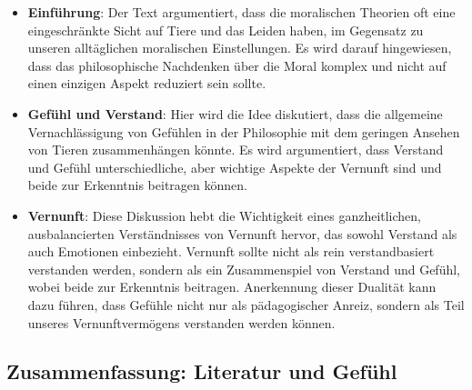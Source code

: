 \documentclass{article}
\begin{document}
\begin{itemize}
	\item \textbf{Einführung}: Der Text argumentiert, dass die moralischen Theorien oft eine eingeschränkte Sicht auf Tiere und das Leiden haben, im Gegensatz zu unseren alltäglichen moralischen Einstellungen. Es wird darauf hingewiesen, dass das philosophische Nachdenken über die Moral komplex und nicht auf einen einzigen Aspekt reduziert sein sollte.

	\item \textbf{Gefühl und Verstand}: Hier wird die Idee diskutiert, dass die allgemeine Vernachlässigung von Gefühlen in der Philosophie mit dem geringen Ansehen von Tieren zusammenhängen könnte. Es wird argumentiert, dass Verstand und Gefühl unterschiedliche, aber wichtige Aspekte der Vernunft sind und beide zur Erkenntnis beitragen können.

	\item \textbf{Vernunft}: Diese Diskussion hebt die Wichtigkeit eines ganzheitlichen, ausbalancierten Verständnisses von Vernunft hervor, das sowohl Verstand als auch Emotionen einbezieht. Vernunft sollte nicht als rein verstandbasiert verstanden werden, sondern als ein Zusammenspiel von Verstand und Gefühl, wobei beide zur Erkenntnis beitragen. Anerkennung dieser Dualität kann dazu führen, dass Gefühle nicht nur als pädagogischer Anreiz, sondern als Teil unseres Vernunftvermögens verstanden werden können.
\end{itemize}

\subsection{Zusammenfassung: Literatur und Gefühl}
\end{document}
